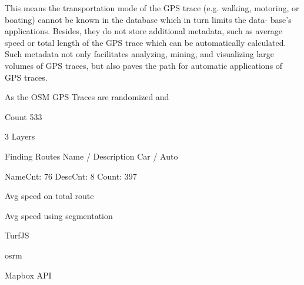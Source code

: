  This means the transportation mode of the GPS trace (e.g. walking, motoring, or boating) cannot be known in the database which in turn limits the data- base’s applications. Besides, they do not store additional metadata, such as average speed or total length of the GPS trace which can be automatically calculated. Such metadata not only facilitates analyzing, mining, and visualizing large volumes of GPS traces, but also paves the path for automatic applications of GPS traces.


\autocite[]{Zhang2012}

As the OSM GPS Traces are randomized and 

Count 533

3 Layers




Finding Routes Name / Description Car / Auto

NameCnt: 76
DescCnt: 8
Count: 397

Avg speed on total route

Avg speed using segmentation




TurfJS


osrm

Mapbox API





